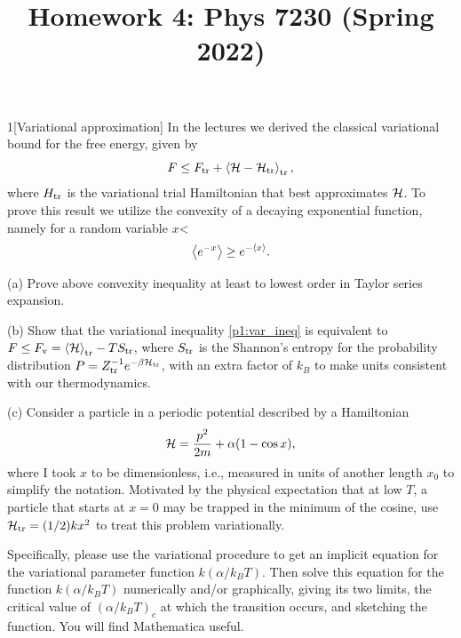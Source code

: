 \documentclass[12pt]{article}
\title{Homework 4: Phys 7230 (Spring 2022)}
\begin{document}
\maketitle
\begin{problem}{1}[Variational approximation]
In the lectures we derived the classical variational bound for the free energy,
given by
\begin{equation}
    F\leq F_{\text{tr}}+\expval{\mathcal{H}-\mathcal{H}_{\text{tr}}}_{\text{tr}}, 
\end{equation}
where $H_{\text{tr}}$ is the variational trial Hamiltonian that best approximates
$\mathcal{H}$. To prove this result we utilize the convexity of a decaying exponential
function, namely for a random variable $x$<
\begin{equation}\label{p1:var_ineq}
    \expval{e^{-x}}\geq e^{-\expval{x}}. 
\end{equation}

(a) Prove above convexity inequality at least to lowest order in Taylor series
expansion.
\begin{solution}
\end{solution}

(b) Show that the variational inequality \eqref{p1:var_ineq} is equivalent to
$F\leq F_{\text{v}}=\expval{\mathcal{H}}_{\text{tr}}-TS_{\text{tr}}$, where $S_{\text{tr}}$ is the Shannon's
entropy for the probability distribution $P=Z_{\text{tr}}^{-1}e^{-\beta\mathcal{H}_{\text{tr}}}$,
with an extra factor of $k_B$ to make units consistent with our thermodynamics.
\begin{solution}
    
\end{solution}

(c) Consider a particle in a periodic potential described by a Hamiltonian
\begin{equation}
    \mathcal{H}=\frac{p^2}{2m}+\alpha(1-\cos x), 
\end{equation}
where I took $x$ to be dimensionless, i.e., measured in units of another length
$x_0$ to simplify the notation. Motivated by the physical expectation that at
low $T$, a particle that starts at $x=0$ may be trapped in the minimum of the
cosine, use $\mathcal{H}_{\text{tr}}=(1/2)kx^2$ to treat this problem variationally.

Specifically, please use the variational procedure to get an implicit equation
for the variational parameter function $k(\alpha/k_BT)$. Then solve this
equation for the function $k(\alpha/k_BT)$ numerically and/or graphically,
giving its two limits, the critical value of $(\alpha/k_BT)_c$ at which the
transition occurs, and sketching the function. You will find Mathematica useful.


\end{problem}
\end{document}

